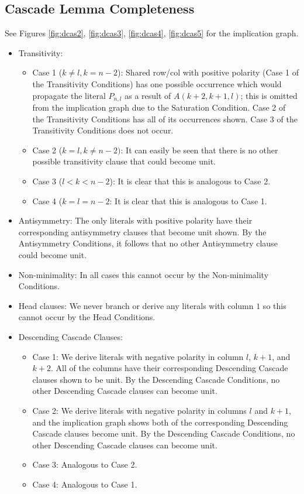 \documentclass[10pt,a4paper]{article}
\begin{document}
\subsection{Cascade Lemma Completeness}
See Figures \ref{fig:dcas2}, \ref{fig:dcas3}, \ref{fig:dcas4}, \ref{fig:dcas5} for the implication graph.
\begin{itemize}
    \item Transitivity: 
    \begin{itemize}
        \item Case 1 ($k \neq l, k = n - 2$): Shared row/col with positive polarity (Case 1 of the Transitivity Conditions) has one possible occurrence which would propagate the literal $P_{n, l}$ as a result of $A(k + 2, k + 1, l)$; this is omitted from the implication graph due to the Saturation Condition. Case 2 of the Transitivity Conditions has all of its occurrences shown. Case 3 of the Transitivity Conditions does not occur.
        \item Case 2 ($k = l, k \neq n - 2)$: It can easily be seen that there is no other possible transitivity clause that could become unit.
        \item Case 3 ($l < k < n - 2$): It is clear that this is analogous to Case 2.
        \item Case 4 ($k = l = n - 2$: It is clear that this is analogous to Case 1.
    \end{itemize}
    \item Antisymmetry: The only literals with positive polarity have their corresponding antisymmetry clauses that become unit shown. By the Antisymmetry Conditions, it follows that no other Antisymmetry clause could become unit. 
    \item Non-minimality: In all cases this cannot occur by the Non-minimality Conditions. 
    \item Head clauses: We never branch or derive any literals with column $1$ so this cannot occur by the Head Conditions.
    \item Descending Cascade Clauses: 
    \begin{itemize}
        \item Case 1: We derive literals with negative polarity in column $l$, $k + 1$, and $k + 2$. All of the columns have their corresponding Descending Cascade clauses shown to be unit. By the Descending Cascade Conditions, no other Descending Cascade clauses can become unit. 
        \item Case 2: We derive literals with negative polarity in columns $l$ and $k + 1$, and the implication graph shows both of the corresponding Descending Cascade clauses become unit. By the Descending Cascade Conditions, no other Descending Cascade clauses can become unit. 
        \item Case 3: Analogous to Case 2. 
        \item Case 4: Analogous to Case 1.
    \end{itemize}
\end{itemize}
\end{document}
